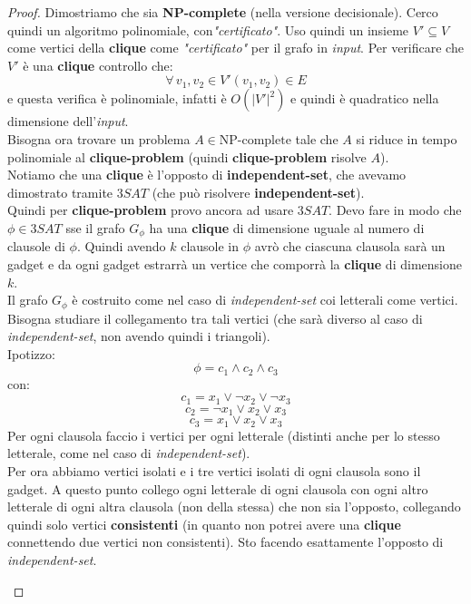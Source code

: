 \begin{proof}
  Dimostriamo che sia \textbf{NP-complete} (nella versione decisionale). Cerco
  quindi un algoritmo 
  polinomiale, con\textit{"certificato"}. Uso quindi un insieme $V'\subseteq V$ come
  vertici della \textbf{clique} come \textit{"certificato"} per il grafo in \textit{input}. Per
  verificare che $V'$ è una \textbf{clique} controllo che:
  \[\forall\,v_1,v_2\in    V' (v_1,v_2)\in E\]
  e questa verifica è polinomiale, infatti è $O(|V'|^2)$ e
  quindi è quadratico nella dimensione dell'\textit{input}.\\
  Bisogna ora trovare un problema $A\in \mbox{NP-complete}$ tale che $A$ si
  riduce in tempo polinomiale al \textbf{clique-problem} (quindi
  \textbf{clique-problem} risolve $A$).  \\
  Notiamo che una \textbf{clique} è l'opposto di \textbf{independent-set}, che
  avevamo dimostrato tramite $3SAT$ (che può risolvere
  \textbf{independent-set}).\\
  Quindi per \textbf{clique-problem} provo ancora ad usare $3SAT$. Devo fare in
  modo che $\phi\in 3SAT$ sse il grafo $G_\phi$ ha una \textbf{clique} di
  dimensione uguale al numero di clausole di $\phi$. Quindi avendo $k$ clausole
  in $\phi$ avrò che ciascuna clausola sarà un gadget e da ogni gadget estrarrà
  un vertice che comporrà la \textbf{clique} di dimensione $k$.\\
  Il grafo $G_\phi$ è costruito come nel caso di \textit{independent-set} coi
  letterali come vertici.\\
  Bisogna studiare il collegamento tra tali vertici (che sarà diverso al caso di
  \textit{independent-set}, non avendo quindi i triangoli).\\
  Ipotizzo:
  \[\phi=c_1\land c_2\land c_3\]
  con:
  \[c_1=x_1\lor \neg x_2\lor \neg x_3\]
  \[c_2=\neg x_1\lor x_2\lor x_3\]
  \[c_3=x_1\lor x_2\lor x_3\]
  Per ogni clausola faccio i vertici per ogni letterale (distinti anche per lo
  stesso letterale, come nel caso di \textit{independent-set}).\\
  Per ora abbiamo vertici isolati e i tre vertici isolati di ogni clausola sono
  il gadget. A questo punto collego ogni letterale di ogni clausola con ogni
  altro letterale di ogni altra clausola (non della stessa) che non sia
  l'opposto, collegando quindi solo vertici \textbf{consistenti} (in quanto non
  potrei avere una \textbf{clique} connettendo due vertici non consistenti). Sto
  facendo esattamente l'opposto di \textit{independent-set}. 
  \begin{figure}

\end{figure}
\end{proof}
